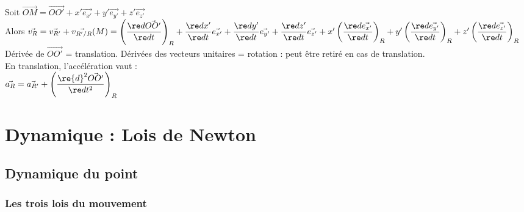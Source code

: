 \documentclass[13pt, twoside, a4paper, french]{report}
\begin{document}
        Soit $\vec{OM} = \vec{OO'} + x' \vec{e_{x'}} + y' \vec{e_{y'}} + z' \vec{e_{z'}}$\\
        Alors $\vec{v_{R}} = \vec{v_{R'}} + \vec{v_{R'/R}}(M) = \left( \dfrac{\re d \vec{OO'}}{\re d t} \right)_R + \dfrac{\re d x'}{\re d t} \vec{e_{x'}} + \dfrac{\re d y'}{\re d t} \vec{e_{y'}} + \dfrac{\re d z'}{\re d t} \vec{e_{z'}} + x' \left( \dfrac{\re d \vec{e_{x'}}}{\re d t} \right)_R + y' \left( \dfrac{\re d \vec{e_{y'}}}{\re d t} \right)_R + z' \left( \dfrac{\re d \vec{e_{z'}}}{\re d t} \right)_R$\\

        Dérivée de $\vec{OO'}$ = translation.
        Dérivées des vecteurs unitaires = rotation : peut être retiré en cas de translation.\\
        En translation, l'accélération vaut :\\

        $\vec{a_R} = \vec{a_{R'}} + \left( \dfrac{\re{d}^2 \vec{OO'}}{\re d t^2} \right)_R$



\chapter{Dynamique : Lois de Newton}\label{ch:dynamique-lois-de-newton}

    \section{Dynamique du point}\label{sec:dynamique-du-point}

        \subsection{Les trois lois du mouvement}\label{subsec:les-trois-lois-du-mouvement}
\end{document}

